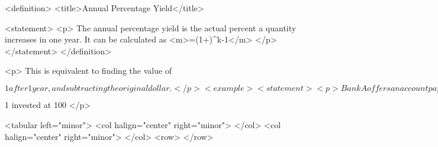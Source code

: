         <definition>
            <title>Annual Percentage Yield</title>

            <statement>
                <p>
                    The annual percentage yield is the actual percent a quantity increases in one year.
                    It can be calculated as <m>=(1+)^{k}-1</m>
                </p>
            </statement>
        </definition>

        <p>
            This is equivalent to finding the value of $1 after 1 year, and subtracting the original dollar.
        </p>

        <example>
            <statement>
                <p>
                    Bank A offers an account paying 1.2%
                    Bank B offers an account paying 1.1%
                    Which is offering a better rate?
                </p>

                <p>
                    We can compare these rates using the annual percentage yield – the actual percent increase in a year.
                    Bank A: <m>\text{APY}=(1+\dfrac{0.012}{4})^{4}-1=0.012054 = 1.2054\%</m> Bank B: <m>\text{APY}=(1+\dfrac{0.011}{12})^{12}-1=0.011056 = 1.1056\%</m>
                </p>

                <p>
                    Bank B’s monthly compounding is not enough to catch up with Bank A’s better APR, so Bank A offers a better rate.
                </p>
            </statement>
        </example>
    </subsection>


    <subsection>
        <title>A Limit to Compounding</title>

        <p>
            As we saw earlier, the amount we earn increases as we increase the compounding frequency.
            The table, though, shows that the increase from annual to semi-annual compounding is larger than the increase from monthly to daily compounding.
            This might lead us to believe that although increasing the frequency of compounding will increase our result, there is an upper limit to this process.
        </p>

        <p>
            To see this, let us examine the value of $1 invested at 100%
        </p>

        <tabular left="minor">
            <col halign="center" right="minor"> </col> <col halign="center" right="minor"> </col>
            <row>
            </row>

